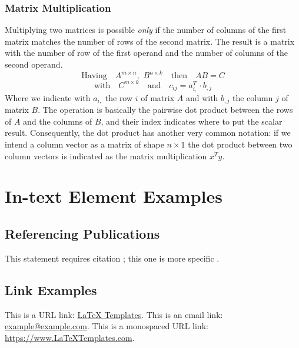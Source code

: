 \documentclass[
	11pt, %
	fleqn, %
	a4paper, %
]{LegrandOrangeBook}
\begin{document}
\subsection{Matrix Multiplication}
Multiplying two matrices is possible \textit{only} if the number of columns of the first matrix matches the number of rows of the second matrix. The result is a matrix with the number of row of the first operand and the number of columns of the second operand.
$$\text{Having} \quad A^{m\times n}, \,\, B^{n\times k} \quad \text{then} \quad AB = C $$
$$\text{with} \quad C^{m\times k} \quad \text{and} \quad c_{ij} = a_{i,}^T \cdot b_{,j}$$
Where we indicate with $a_{i,}$ the row $i$ of matrix $A$ and with $b_{,j}$ the column $j$ of matrix $B$. The operation is basically the pairwise dot product between the rows of $A$ and the columns of $B$, and their index indicates where to put the scalar result.
Consequently, the dot product has another very common notation: if we intend a column vector as a matrix of shape $n \times 1$ the dot product between two column vectors is indicated as the matrix multiplication $x^T y$.




\chapter{In-text Element Examples}

\section{Referencing Publications}

This statement requires citation \cite{Smith:2022jd}; this one is more specific \cite[162]{Smith:2021qr}.


\section{Link Examples}

This is a URL link: \href{https://www.latextemplates.com}{LaTeX Templates}. This is an email link: \href{mailto:example@example.com}{example@example.com}. This is a monospaced URL link: \url{https://www.LaTeXTemplates.com}.
\end{document}

